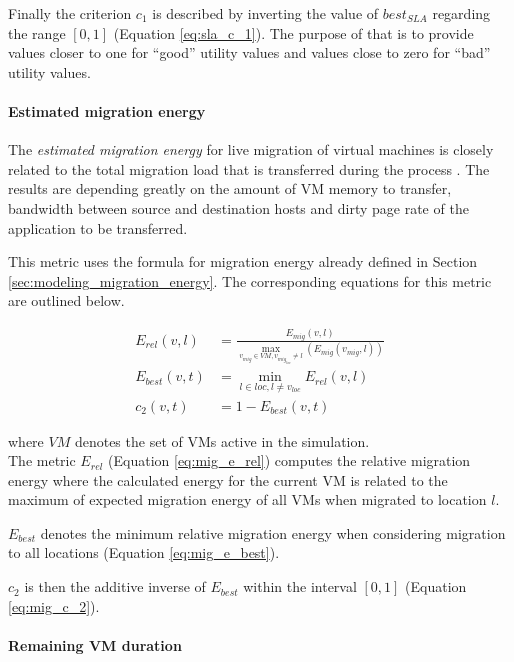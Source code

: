 Finally the criterion $c_1$ is described by inverting the value of $best_{SLA}$ regarding the range $[0,1]$ (Equation \ref{eq:sla_c_1}). The purpose of that is to provide values closer to one for ``good'' utility values and values close to zero for ``bad'' utility values. 


\paragraph{Estimated migration energy}

The \textit{estimated migration energy} for live migration of virtual machines is closely related to the total migration load that is transferred during the process \cite{liu2013performance}. The results are depending greatly on the amount of VM memory to transfer, bandwidth between source and destination hosts and dirty page rate of the application to be transferred. 

This metric uses the formula for migration energy already defined in Section \ref{sec:modeling_migration_energy}. 
The corresponding equations for this metric are outlined below. 

\begin{align}
	E_{rel} (v,l) &= \frac{E_{mig}(v,l)}{\max_{v_{mig} \in VM, v_{mig_{loc}} \neq l} (E_{mig}(v_{mig},l))} \label{eq:mig_e_rel} \\
	E_{best} (v,t) &= \min_{l \in loc, l \neq v_{loc}} E_{rel} (v,l) \label{eq:mig_e_best}\\
	c_2(v,t) &= 1 - E_{best}(v,t) \label{eq:mig_c_2}
\end{align}


where $VM$ denotes the set of VMs active in the simulation. \\
The metric $E_{rel}$ (Equation \ref{eq:mig_e_rel}) computes the relative migration energy where the calculated energy for the current VM is related to the maximum of expected migration energy of all VMs when migrated to location $l$. 

$E_{best}$ denotes the minimum relative migration energy when considering migration to all locations (Equation \ref{eq:mig_e_best}). 

$c_2$ is then the additive inverse of $E_{best}$ within the interval $[0,1]$ (Equation \ref{eq:mig_c_2}). 



\paragraph{Remaining VM duration} \label{par:remaining_vm_duration}

